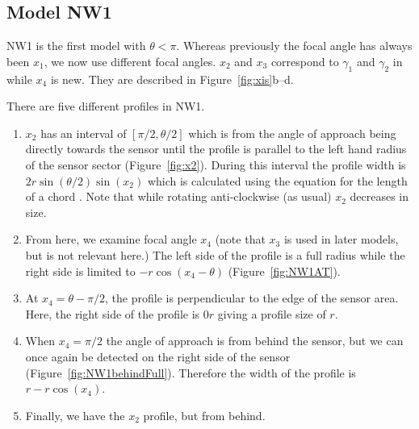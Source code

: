 \subsection{Model NW1} \label{NW1}

NW1 is the first model with $\theta < \pi$.
Whereas previously the focal angle has always been $x_1$, we now use different focal angles.
$x_2$ and $x_3$ correspond to $\gamma_1$ and $\gamma_2$ in \cite{rowcliffe2008estimating} while $x_4$ is new.
They are described in Figure~\ref{fig:xis}b--d.

There are five different profiles in NW1.
\begin{enumerate}
\item $x_2$ has an interval of $[\pi/2, \theta/2]$ which is from the angle of approach being directly towards the sensor until the profile is parallel to the left hand radius of the sensor sector (Figure~\ref{fig:x2}).
During this interval the profile width is $2r\sin\left(\theta/2\right)\sin(x_2)$ which is calculated using the equation for the length of a chord .
Note that while rotating anti-clockwise (as usual) $x_2$ decreases in size.
\item From here, we examine focal angle $x_4$ (note that $x_3$ is used in later models, but is not relevant here.)  The left side of the profile is a full radius while the right side is limited to $- r\cos(x_4 - \theta)$ (Figure~\ref{fig:NW1AT}).
\item At $x_4 =  \theta - \pi/2$, the profile is perpendicular to the edge of the sensor area.
Here, the right side of the profile is $0r$ giving a profile size of $r$.
\item When $x_4 = \pi/2$ the angle of approach is from behind the sensor, but we can once again be detected on the right side of the sensor (Figure~\ref{fig:NW1behindFull}).
Therefore the width of the profile is $r - r\cos(x_4)$.
\item  Finally, we have the $x_2$ profile, but from behind.
\end{enumerate}





